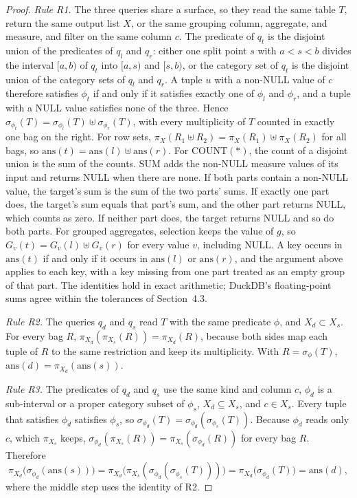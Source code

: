 \documentclass[10pt]{article}
\newcommand{\ans}{\mathrm{ans}}
\begin{document}
\begin{proof}
\emph{Rule R1.} The three queries share a surface, so they read the same table $T$, return the same output list $X$, or the same grouping column, aggregate, and measure, and filter on the same column $c$. The predicate of $q_t$ is the disjoint union of the predicates of $q_l$ and $q_r$: either one split point $s$ with $a < s < b$ divides the interval $[a, b)$ of $q_t$ into $[a, s)$ and $[s, b)$, or the category set of $q_t$ is the disjoint union of the category sets of $q_l$ and $q_r$. A tuple $u$ with a non-NULL value of $c$ therefore satisfies $\phi_t$ if and only if it satisfies exactly one of $\phi_l$ and $\phi_r$, and a tuple with a NULL value satisfies none of the three. Hence $\sigma_{\phi_t}(T) = \sigma_{\phi_l}(T) \uplus \sigma_{\phi_r}(T)$, with every multiplicity of $T$ counted in exactly one bag on the right. For row sets, $\pi_X(R_1 \uplus R_2) = \pi_X(R_1) \uplus \pi_X(R_2)$ for all bags, so $\ans(t) = \ans(l) \uplus \ans(r)$. For $\mathrm{COUNT}(*)$, the count of a disjoint union is the sum of the counts. $\mathrm{SUM}$ adds the non-NULL measure values of its input and returns NULL when there are none. If both parts contain a non-NULL value, the target's sum is the sum of the two parts' sums. If exactly one part does, the target's sum equals that part's sum, and the other part returns NULL, which counts as zero. If neither part does, the target returns NULL and so do both parts. For grouped aggregates, selection keeps the value of $g$, so $G_v(t) = G_v(l) \uplus G_v(r)$ for every value $v$, including NULL. A key occurs in $\ans(t)$ if and only if it occurs in $\ans(l)$ or $\ans(r)$, and the argument above applies to each key, with a key missing from one part treated as an empty group of that part. The identities hold in exact arithmetic; DuckDB's floating-point sums agree within the tolerances of Section~4.3.

\emph{Rule R2.} The queries $q_d$ and $q_s$ read $T$ with the same predicate $\phi$, and $X_d \subset X_s$. For every bag $R$, $\pi_{X_d}(\pi_{X_s}(R)) = \pi_{X_d}(R)$, because both sides map each tuple of $R$ to the same restriction and keep its multiplicity. With $R = \sigma_\phi(T)$, $\ans(d) = \pi_{X_d}(\ans(s))$.

\emph{Rule R3.} The predicates of $q_d$ and $q_s$ use the same kind and column $c$, $\phi_d$ is a sub-interval or a proper category subset of $\phi_s$, $X_d \subseteq X_s$, and $c \in X_s$. Every tuple that satisfies $\phi_d$ satisfies $\phi_s$, so $\sigma_{\phi_d}(T) = \sigma_{\phi_d}(\sigma_{\phi_s}(T))$. Because $\phi_d$ reads only $c$, which $\pi_{X_s}$ keeps, $\sigma_{\phi_d}(\pi_{X_s}(R)) = \pi_{X_s}(\sigma_{\phi_d}(R))$ for every bag $R$. Therefore
\begin{equation*}
\pi_{X_d}\bigl(\sigma_{\phi_d}(\ans(s))\bigr)
= \pi_{X_d}\bigl(\pi_{X_s}(\sigma_{\phi_d}(\sigma_{\phi_s}(T)))\bigr)
= \pi_{X_d}\bigl(\sigma_{\phi_d}(T)\bigr) = \ans(d),
\end{equation*}
where the middle step uses the identity of R2.


\end{proof}
\end{document}
